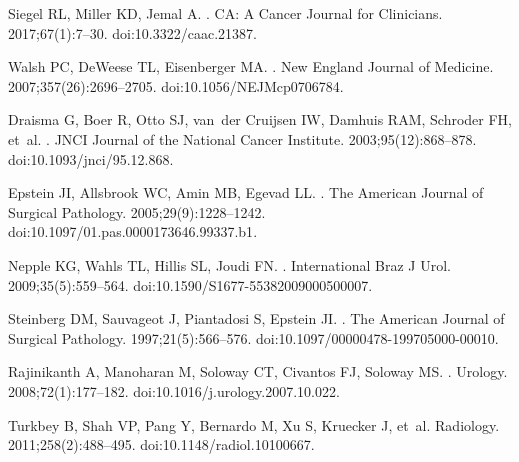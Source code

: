 \documentclass[10pt,letterpaper]{article}
\begin{document}
\begin{thebibliography}{10}

Siegel RL, Miller KD, Jemal A.
.
\newblock CA: A Cancer Journal for Clinicians. 2017;67(1):7--30.
\newblock doi:{10.3322/caac.21387}.

Walsh PC, DeWeese TL, Eisenberger MA.
.
\newblock New England Journal of Medicine. 2007;357(26):2696--2705.
\newblock doi:{10.1056/NEJMcp0706784}.

Draisma G, Boer R, Otto SJ, van~der Cruijsen IW, Damhuis RAM, Schroder FH,
  et~al.
.
\newblock JNCI Journal of the National Cancer Institute. 2003;95(12):868--878.
\newblock doi:{10.1093/jnci/95.12.868}.

Epstein JI, Allsbrook WC, Amin MB, Egevad LL.
.
\newblock The American Journal of Surgical Pathology. 2005;29(9):1228--1242.
\newblock doi:{10.1097/01.pas.0000173646.99337.b1}.

Nepple KG, Wahls TL, Hillis SL, Joudi FN.
.
\newblock International Braz J Urol. 2009;35(5):559--564.
\newblock doi:{10.1590/S1677-55382009000500007}.

Steinberg DM, Sauvageot J, Piantadosi S, Epstein JI.
.
\newblock The American Journal of Surgical Pathology. 1997;21(5):566--576.
\newblock doi:{10.1097/00000478-199705000-00010}.

Rajinikanth A, Manoharan M, Soloway CT, Civantos FJ, Soloway MS.
.
\newblock Urology. 2008;72(1):177--182.
\newblock doi:{10.1016/j.urology.2007.10.022}.

Turkbey B, Shah VP, Pang Y, Bernardo M, Xu S, Kruecker J, et~al.
\newblock Radiology. 2011;258(2):488--495.
\newblock doi:{10.1148/radiol.10100667}.


\end{thebibliography}
\end{document}
